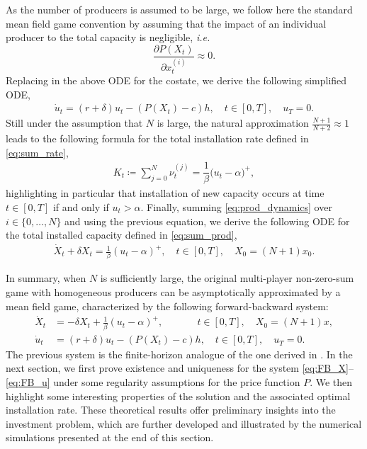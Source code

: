 \documentclass[12pt]{article}
\def\Nu{K}
\begin{document}
As the number of producers is assumed to be large, we follow here the standard mean field game convention by assuming that the impact of an individual producer to the total capacity is negligible, \textit{i.e.}
$$\frac{\partial P(X_t)}{\partial x_{t}^{(i)}} \approx 0.$$
Replacing in the above ODE for the costate, we derive the following simplified ODE,
\begin{align*}
\dot{u}_{t}=(r+\delta)u_{t}-(P(X_t)-c)h,\quad t \in [0,T], \quad u_{T}^{}=0.
\end{align*}
Still under the assumption that $N$ is large, the natural approximation $\frac{N+1}{N+2}\approx1$ leads to the following formula for the total installation rate defined in \eqref{eq:sum_rate},
\begin{align*}
\Nu_t \coloneq \sum_{j =0}^N \nu_t^{(j)} = \dfrac{1}{\beta} \big(u_{t}^{}-\alpha\big)^+,
\end{align*}
highlighting in particular that installation of new capacity occurs at time $t \in [0,T]$ if and only if $u_t> \alpha$. 
Finally, summing \eqref{eq:prod_dynamics} over $i \in \{0, \dots, N\}$ and using the previous equation, we derive the following ODE for the total installed capacity defined in \eqref{eq:sum_prod},
\begin{align*}
\dot{X}_t+\delta X_t=\frac{1}{\beta}(u_t-\alpha)^+, \quad t \in [0,T], \quad X_0=(N+1)x_0.
\end{align*}

In summary, when $N$ is sufficiently large, the original multi-player non-zero-sum game with homogeneous producers can be asymptotically approximated by a mean field game, characterized by the following forward-backward system:
\begin{subequations}\label{eq:FB_system}
\begin{align}
\dot{X}_t &= - \delta X_t + \frac{1}{\beta}(u_t-\alpha)^+, \quad \quad \quad \; \, t \in [0,T], \quad X_0=(N+1)x,
\label{eq:FB_X}\\
\dot{u}_{t} &=(r+\delta)u_{t}-\left(P(X_t)-c\right)h, \quad t \in [0,T], \quad u_{T}^{}=0.\label{eq:FB_u}
\end{align}
\end{subequations} 
The previous system is the finite-horizon analogue of the one derived in \cite{alasseur2023mean}. In the next section, we first prove existence and uniqueness for the system \eqref{eq:FB_X}--\eqref{eq:FB_u} under some regularity assumptions for the price function $P$. We then highlight some interesting properties of the solution and the associated optimal installation rate. These theoretical results offer preliminary insights into the investment problem, which are further developed and illustrated by the numerical simulations presented at the end of this section.
\end{document}
